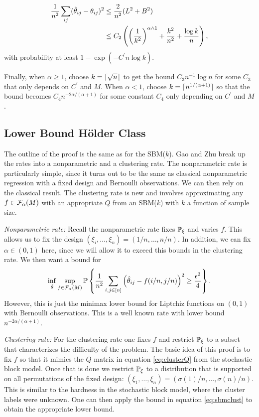 \documentclass[11pt]{article}
\begin{document}
\begin{align*}
    \frac{1}{n^2} \sum_{ij}(\hat{\theta}_{ij}-\theta_{ij})^2 & \leq \frac{2}{n^2}(L^2 + B^2) \\
    & \leq C_2 \left( \left( \frac{1}{k^2} \right)^{\alpha \wedge 1} + \frac{k^2}{n^2} + \frac{\log k}{n} \right),
\end{align*}
with probability at least $1-\exp(-C^\prime n \log k)$.

Finally, when $\alpha \geq 1$, choose $k = \lceil\sqrt{n}\rceil $ to get the bound $C_3n^{-1}\log n$ for some $C_3$ that only depends on $C^\prime$ and $M$. When $\alpha < 1$, choose $k = \lceil n^{1/(\alpha+1)}\rceil$ so that the bound becomes $C_4n^{-2\alpha/(\alpha+1)}$ for some constant $C_4$ only depending on $C^\prime$ and $M$.

\subsection{Lower Bound H\"older Class} \label{sec:lower_hold}

The outline of the proof is the same as for the SBM($k$). Gao and Zhu break up the rates into a nonparametric and a clustering rate. The nonparametric rate is particularly simple, since it turns out to be the same as classical nonparametric regression with a fixed design and Bernoulli observations. We can then rely on the classical result. The clustering rate is new and involves approximating any $f \in \mathcal{F}_{\alpha}(M)$ with an appropriate $Q$ from an SBM($k$) with $k$ a function of sample size.

\textit{Nonparametric rate:} Recall the nonparametric rate fixes $\mathbb{P}_{\xi}$ and varies $f$. This allows us to fix the design $(\xi_i, \dots, \xi_n) = (1/n, \dots, n/n)$. In addition, we can fix $\alpha \in (0, 1)$ here, since we will allow it to exceed this bounds in the clustering rate. We then want a bound for
\begin{equation}
\inf_{\hat{\theta}}\sup_{f \in \mathcal{F}_{\alpha}(M)} \mathbb{P} \left\{\frac{1}{n^2} \sum_{i,j \in \lbrack n\rbrack} \left(\hat{\theta}_{ij} - f(i/n, j/n)\right)^2 \geq \frac{\epsilon^2}{4}\right\}.
\end{equation}
However, this is just the minimax lower bound for Liptchiz functions on $(0, 1)$ with Bernoulli observations. This is a well known rate with lower bound $n^{-2\alpha/(\alpha + 1)}$.

\textit{Clustering rate:} For the clustering rate one fixes $f$ and restrict $\mathbb{P}_{\xi}$ to a subset that characterizes the difficulty of the problem. The basic idea of this proof is to fix $f$ so that it mimics the $Q$ matrix in equation \ref{eq:clusterQ} from the stochastic block model. Once that is done we restrict $\mathbb{P}_{\xi}$ to a distribution that is supported on all permutations of the fixed design: $(\xi_1, \dots, \xi_n) = (\sigma(1)/n, \dots, \sigma(n)/n)$. This is similar to the hardness in the stochastic block model, where the cluster labels were unknown. One can then apply the bound in equation \ref{eq:sbmclust} to obtain the appropriate lower bound.
\end{document}
